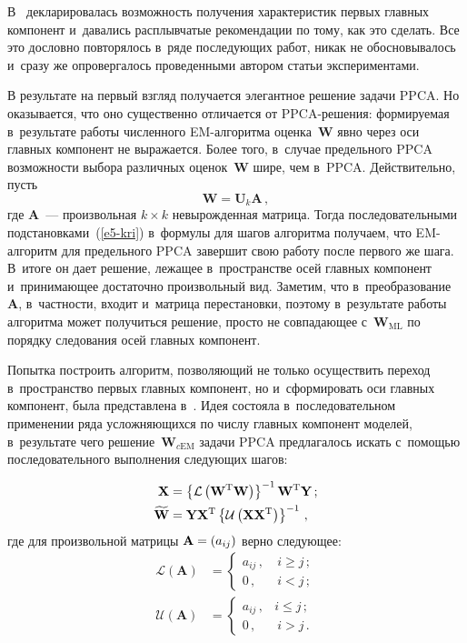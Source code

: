 \begin{multicols}{2}
     В~\cite{5-kri} декларировалась возможность получения характеристик 
первых главных компонент и~давались расплывчатые рекомендации по тому, 
как это сделать. Все это дословно повторялось в~ряде последующих работ, 
никак не обосновывалось и~сразу же опровергалось проведенными автором 
статьи экспериментами. 
     
     В результате на первый взгляд получается элегантное решение задачи 
PPCA. Но оказывается, что оно существенно отличается от PPCA-ре\-ше\-ния: 
формируемая в~результате работы численного EM-алгоритма 
оценка~$\mathbf{W}$ явно через оси главных компонент не выражается. Более 
того, в~случае предельного PPCA возможности выбора различных 
оценок~$\mathbf{W}$ шире, чем в~PPCA. Действительно, пусть
     \begin{equation}
     \mathbf{W}=\mathbf{U}_k\mathbf{A}\,,
     \label{e5-kri}
     \end{equation}
где $\mathbf{A}$~--- произвольная $k\times k$ невырожденная матрица. Тогда 
последовательными подстановками~(\ref{e5-kri}) в~формулы для шагов 
алгоритма получаем, что EM-ал\-го\-ритм для предельного PPCA завершит 
свою работу после первого же шага. В~итоге он дает решение, лежащее 
в~пространстве осей главных компонент и~принимающее достаточно 
произвольный вид. Заметим, что в~преобразование~$\mathbf{A}$,  
в~част\-ности, входит и~матрица перестановки, поэтому в~результате работы 
алгоритма может получиться решение, просто не совпадающее 
с~$\mathbf{W}_{\mathrm{ML}}$ по порядку следования осей главных компонент. 

     Попытка построить алгоритм, позволяющий не только осуществить 
переход в~пространство первых главных компонент, но и~сформировать оси 
главных компонент, была представлена в~\cite{6-kri}. Идея состояла 
в~последовательном применении ряда усложняющихся по числу главных 
компонент моделей, в~результате чего решение~$\mathbf{W}_{c\mathrm{EM}}$ задачи 
PPCA предлагалось искать с~по\-мощью последовательного выполнения 
следующих шагов: 

\noindent
     \begin{align*}
     \mathbf{X} &= \left\{ \cal{L} \left(\mathbf{W}^{\mathrm{T}} 
\mathbf{W}\right)\right\}^{-1} \mathbf{W}^{\mathrm{T}} \mathbf{Y}\,;\\
     \widetilde{\mathbf{W}} &= \mathbf{Y}\mathbf{X}^{\mathrm{T}}\left\{ 
\cal{U}\left(\mathbf{X}\mathbf{X}^{\mathrm{T}}\right)\right\}^{-1}\,,
     \end{align*}
где для произвольной матрицы $\mathbf{A}\hm= (a_{ij})$ верно следующее:
\begin{align*}
\mathcal{L}(\mathbf{A}) &=\begin{cases}
a_{ij}\,, &\ i\geq j\,;\\
0\,, &\ i<j\,;
\end{cases}
\\
     \mathcal{U}(\mathbf{A}) &= \begin{cases}
     a_{ij}\,, & i\leq j\,;\\
     0\,, &\ i>j\,.
     \end{cases}
     \end{align*}
     

\end{multicols}
